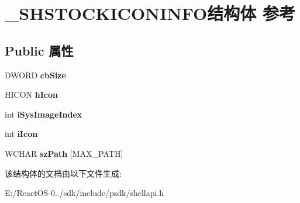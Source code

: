 \hypertarget{struct___s_h_s_t_o_c_k_i_c_o_n_i_n_f_o}{}\section{\+\_\+\+S\+H\+S\+T\+O\+C\+K\+I\+C\+O\+N\+I\+N\+F\+O结构体 参考}
\label{struct___s_h_s_t_o_c_k_i_c_o_n_i_n_f_o}
\subsection*{Public 属性}
\begin{DoxyCompactItemize}
\item 
\mbox{\label{struct___s_h_s_t_o_c_k_i_c_o_n_i_n_f_o_a02c83207d1cc6acec791e3e94b955401}} 
D\+W\+O\+RD {\bfseries cb\+Size}
\item 
\mbox{\label{struct___s_h_s_t_o_c_k_i_c_o_n_i_n_f_o_a474bdf1ee3073a1f16292db1da4c118a}} 
H\+I\+C\+ON {\bfseries h\+Icon}
\item 
\mbox{\label{struct___s_h_s_t_o_c_k_i_c_o_n_i_n_f_o_ac4be7eb10c1ac31526cbadaf21ca725c}} 
int {\bfseries i\+Sys\+Image\+Index}
\item 
\mbox{\label{struct___s_h_s_t_o_c_k_i_c_o_n_i_n_f_o_a4b696d8be7755ad7ccec137ef58fcdea}} 
int {\bfseries i\+Icon}
\item 
\mbox{\label{struct___s_h_s_t_o_c_k_i_c_o_n_i_n_f_o_a89a818591a8d79d550c5dfe83a2de288}} 
W\+C\+H\+AR {\bfseries sz\+Path} \mbox{[}M\+A\+X\+\_\+\+P\+A\+TH\mbox{]}
\end{DoxyCompactItemize}


该结构体的文档由以下文件生成\+:\begin{DoxyCompactItemize}
\item 
E\+:/\+React\+O\+S-\/0../sdk/include/psdk/shellapi.\+h\end{DoxyCompactItemize}
